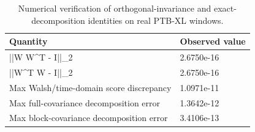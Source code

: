 \begin{table}[t]
\centering
\caption{Numerical verification of orthogonal-invariance and exact-decomposition identities on real PTB-XL windows.}
\label{tab:real-verification}
\begin{tabular}{ll}
\hline
Quantity & Observed value \\
\hline
||W W^T - I||_2 & 2.6750e-16 \\
||W^T W - I||_2 & 2.6750e-16 \\
Max Walsh/time-domain score discrepancy & 1.0971e-11 \\
Max full-covariance decomposition error & 1.3642e-12 \\
Max block-covariance decomposition error & 3.4106e-13 \\
\hline
\end{tabular}
\end{table}
